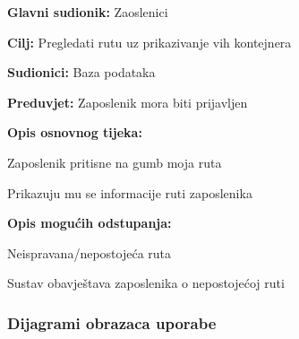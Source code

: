			\noindent {}
			\begin{packed_item}
				
				\item \textbf{Glavni sudionik:} Zaoslenici
				\item  \textbf{Cilj:} Pregledati rutu uz prikazivanje vih kontejnera
				\item  \textbf{Sudionici:} Baza podataka
				\item  \textbf{Preduvjet:} Zaposlenik mora biti prijavljen
				\item  \textbf{Opis osnovnog tijeka:}
				
				\item[] \begin{packed_enum}
					
					\item Zaposlenik pritisne na gumb moja ruta
					\item Prikazuju mu se informacije ruti zaposlenika
					
				\end{packed_enum}
				
				\item  \textbf{Opis mogućih odstupanja:}
				
				\item[] \begin{packed_item}
					
					\item[2.a] Neispravana/nepostojeća ruta
					\item[] \begin{packed_enum}
						
						\item Sustav obavještava zaposlenika o nepostojećoj ruti

					\end{packed_enum}
					
				\end{packed_item}
			\end{packed_item}
			

			\subsubsection{Dijagrami obrazaca uporabe}
            
